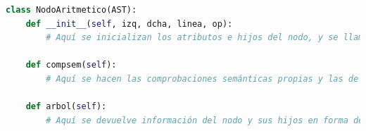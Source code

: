 \documentclass[11pt]{article}
\begin{document}
\begin{minipage}{\linewidth}
    \begin{lstlisting}[language=Python, caption=NodoAritmetico(AST)]          
class NodoAritmetico(AST):
	def __init__(self, izq, dcha, linea, op):
		# Aquí se inicializan los atributos e hijos del nodo, y se llama a compsem()
	
	def compsem(self):
		# Aquí se hacen las comprobaciones semánticas propias y las de los hijos

	def arbol(self):
		# Aquí se devuelve información del nodo y sus hijos en forma de string
	\end{lstlisting}
\end{minipage}
\end{document}
